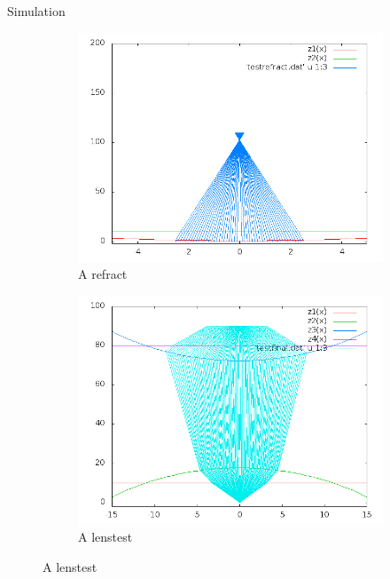 \documentclass{beamer}
\begin{document}
\begin{frame}{Simulation}
\begin{figure}
\centering
\begin{subfigure}{.5\textwidth}
  \centering
  \includegraphics[scale=.3]{out4.png}
  \caption{A refract}
  \label{fig:sub3}
\end{subfigure}%
\begin{subfigure}{.5\textwidth}
  \centering
  \includegraphics[scale=.3]{out5.png}
  \caption{A lenstest}
  \label{fig:sub4}
\end{subfigure}
\label{fig:test2}
\end{figure}

\end{frame}
\end{document}
